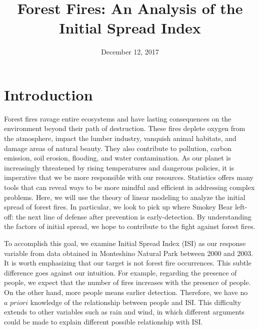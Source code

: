 \documentclass{article}
\begin{document}
\title{Forest Fires: An Analysis of the Initial Spread Index}
\date{December 12, 2017}
\maketitle
\begin{abstract}

\end{abstract}

\section{Introduction}

Forest fires ravage entire ecosystems and have lasting consequences on the environment beyond their path of destruction. These fires deplete oxygen from the atmosphere, impact the lumber industry, vanquish animal habitats, and damage areas of natural beauty. They also contribute to pollution, carbon emission, soil erosion, flooding, and water contamination. As our planet is increasingly threatened by rising temperatures and dangerous policies, it is imperative that we be more responsible with our resources. Statistics offers many tools that can reveal ways to be more mindful and efficient in addressing complex problems. Here, we will use the theory of linear modeling to analyze the initial spread of forest fires. In particular, we look to pick up where Smokey Bear left-off: the next line of defense after prevention is early-detection. By understanding the factors of initial spread, we hope to contribute to the fight against forest fires.

To accomplish this goal, we examine Initial Spread Index (ISI) as our response variable from data obtained in Monteshino Natural Park between 2000 and 2003. It is worth emphasizing that our target is not forest fire occurrences. This subtle difference goes against our intuition. For example, regarding the presence of people, we expect that the number of fires increases with the presence of people. On the other hand, more people means earlier detection. Therefore, we have no $\textit{a priori}$  knowledge of the relationship between people and ISI. This difficulty extends to other variables such as rain and wind, in which different arguments could be made to explain different possible relationship with ISI.
\end{document}
